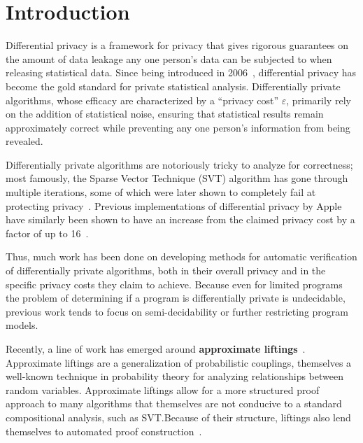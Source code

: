 \documentclass[12pt]{article}
\theoremstyle{definition}
\begin{document}
\section{Introduction}

Differential privacy is a framework for privacy that gives rigorous guarantees on the amount of data leakage any one person's data can be subjected to when releasing statistical data. Since being introduced in 2006~\cite{DP2006}, differential privacy has become the gold standard for private statistical analysis. 
Differentially private algorithms, whose efficacy are characterized by a ``privacy cost'' $\varepsilon$, primarily rely on the addition of statistical noise, ensuring that statistical results remain approximately correct while preventing any one person's information from being revealed. 

Differentially private algorithms are notoriously tricky to analyze for correctness; most famously, the Sparse Vector Technique (SVT) algorithm has gone through multiple iterations, some of which were later shown to completely fail at protecting privacy~\cite{10.14778/3055330.3055331}. Previous implementations of differential privacy by Apple have similarly been shown to have an increase from the claimed privacy cost by a factor of up to 16~\cite{appleleakprivacy}. 

Thus, much work has been done on developing methods for automatic verification of differentially private algorithms, both in their overall privacy and in the specific privacy costs they claim to achieve. 
Because even for limited programs the problem of determining if a program is differentially private is undecidable\cite{barthe.etal2020decidingdp}, previous work tends to focus on semi-decidability or further restricting program models. 

Recently, a line of work has emerged around \textbf{approximate liftings}~\cite{BartheEtAl2016,bartheKopfOlmedo2012ProbabilisticRelationalReasoningforDifferentialPriv,BartheOlmedo2013,HsuThesis2017}. Approximate liftings are a generalization of probabilistic couplings, themselves a well-known technique in probability theory for analyzing relationships between random variables. 
Approximate liftings allow for a more structured proof approach to many algorithms that themselves are not conducive to a standard compositional analysis, such as SVT.\@ Because of their structure, liftings also lend themselves to automated proof construction~\cite{AlbarghouthiHsu2018}. 
\end{document}
